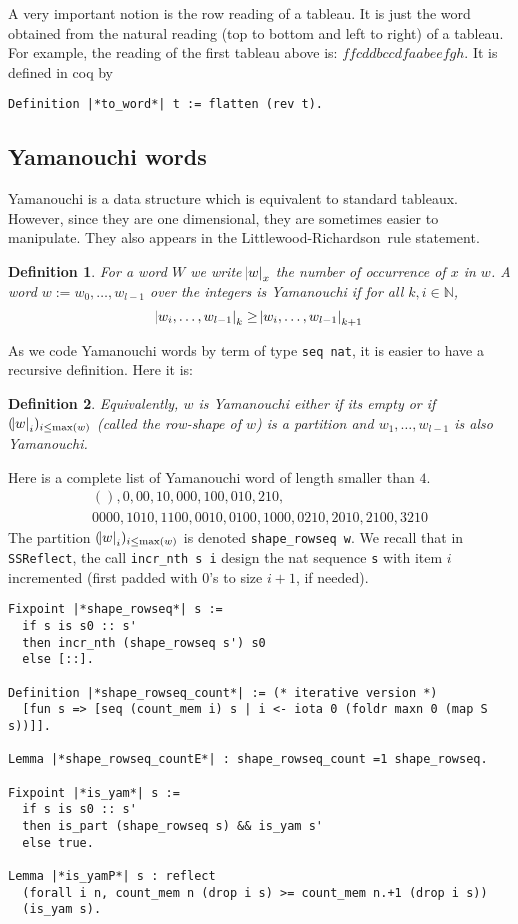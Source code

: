 \documentclass[12pt,a4paper]{article}
\newcommand{\SSR}{\texttt{SSReflect}\xspace}
\newcommand{\LR}{Littlewood-Richardson\ }
\newcommand{\N}{{\mathbb N}}
\newtheorem{DEFN}{Definition}
\begin{document}
A very important notion is the row reading of a tableau. It is just the word
obtained from the natural reading (top to bottom and left to right) of a
tableau. For example, the reading of the first tableau above is:
$ffcddbccdfaabeefgh$.
It is defined in coq by
\begin{lstlisting}
Definition |*to_word*| t := flatten (rev t).
\end{lstlisting}

\subsection{Yamanouchi words}

Yamanouchi is a data structure which is equivalent to standard
tableaux. However, since they are one dimensional, they are sometimes easier
to manipulate. They also appears in the \LR rule statement.

\begin{DEFN}
  For a word $W$ we write $\abs{w}_x$ the number of occurrence of $x$ in $w$.
  A word $w := w_0,\dots,w_{l-1}$ over the integers is \emph{Yamanouchi} if for
  all $k, i \in \N$,
  \[ \abs{w_i,\dots,w_{l-1}}_k \geq \abs{w_i,\dots,w_{l-1}}_{k+1} \]
\end{DEFN}
As we code Yamanouchi words by term of type \lstinline{seq nat}, it is easier
to have a recursive definition. Here it is:
\begin{DEFN}
  Equivalently, $w$ is \emph{Yamanouchi} either if its empty or if
  $(\abs{w}_i)_{i\leq\max(w)}$ (called the row-shape of $w$) is a partition
  and $w_1,\dots,w_{l-1}$ is also Yamanouchi.
\end{DEFN}
Here is a complete list of Yamanouchi word of length smaller than $4$.
\begin{gather}
  (), 0, 00, 10, 000, 100, 010, 210, \\
  0000, 1010, 1100, 0010, 0100, 1000, 0210, 2010, 2100, 3210
\end{gather}
The partition $(\abs{w}_i)_{i\leq\max(w)}$ is denoted \lstinline|shape_rowseq w|.
 We recall that in \SSR, the call \lstinline{incr_nth s i} design the nat
sequence \lstinline|s| with item $i$ incremented (first padded with 0's to
size $i+1$, if needed).

  \begin{lstlisting}
Fixpoint |*shape_rowseq*| s :=
  if s is s0 :: s'
  then incr_nth (shape_rowseq s') s0
  else [::].

Definition |*shape_rowseq_count*| := (* iterative version *)
  [fun s => [seq (count_mem i) s | i <- iota 0 (foldr maxn 0 (map S s))]].

Lemma |*shape_rowseq_countE*| : shape_rowseq_count =1 shape_rowseq.

Fixpoint |*is_yam*| s :=
  if s is s0 :: s'
  then is_part (shape_rowseq s) && is_yam s'
  else true.

Lemma |*is_yamP*| s : reflect
  (forall i n, count_mem n (drop i s) >= count_mem n.+1 (drop i s))
  (is_yam s).
\end{lstlisting}
\end{document}
